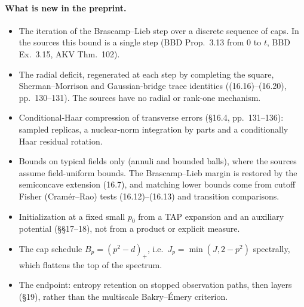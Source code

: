 \documentclass[11pt]{article}
\newcommand{\ploc}[2]{#1}
\begin{document}
\paragraph{What is new in the preprint.}
\begin{itemize}
\item The iteration of the Brascamp--Lieb step over a discrete sequence of
caps. In the sources this bound is a single step (BBD
Prop.~3.13 from $0$ to $t$, BBD Ex.~3.15, AKV Thm.~102).
\item The radial deficit, regenerated at each step by completing the square,
Sherman--Morrison and Gaussian-bridge trace identities
\ploc{((16.16)--(16.20), pp.~130--131)}{cap-multiscale.tex:506--589}. The
sources have no radial or rank-one mechanism.
\item Conditional-Haar compression of transverse errors
\ploc{(\S16.4, pp.~131--136)}{cap-multiscale.tex:591--956}: sampled replicas,
a nuclear-norm integration by parts and a conditionally Haar residual
rotation.
\item Bounds on typical fields only (annuli and bounded balls), where the
sources assume field-uniform bounds. The Brascamp--Lieb margin is restored by
the semiconcave extension (16.7), and matching lower bounds come from cutoff
Fisher (Cram\'er--Rao) tests
\ploc{(16.12)--(16.13)}{cap-multiscale.tex:418, 438} and transition
comparisons.
\item Initialization at a fixed small $p_0$ from a TAP expansion and
an auxiliary potential (\S\S17--18), not from a product or explicit measure.
\item The cap schedule $B_p=(p^2-d)_+$, i.e.\ $J_p=\min(J,2-p^2)$
spectrally, which flattens the top of the spectrum.
\item The endpoint: entropy retention on stopped observation paths, then
layers (\S19), rather than the multiscale Bakry--\'Emery criterion.
\end{itemize}
\end{document}
